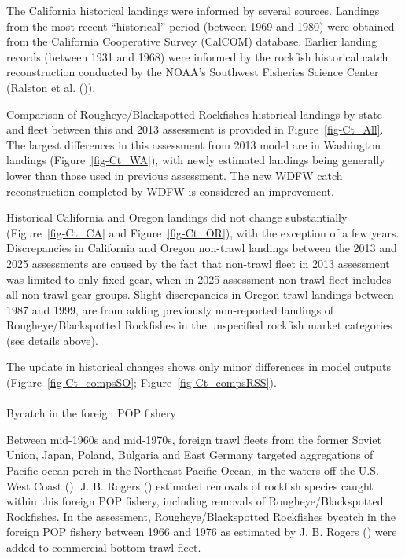\documentclass[
]{scrartcl}
\makeatletter
\let\oldparagraph\paragraph
\renewcommand{\paragraph}{
    \@ifstar
      \xxxParagraphStar
      \xxxParagraphNoStar
  }
\newcommand{\xxxParagraphStar}[1]{\oldparagraph*{#1}\mbox{}}
\newcommand{\xxxParagraphNoStar}[1]{\oldparagraph{#1}\mbox{}}
\makeatother
\begin{document}
The California historical landings were informed by several sources.
Landings from the most recent ``historical'' period (between 1969 and
1980) were obtained from the California Cooperative Survey (CalCOM)
database. Earlier landing records (between 1931 and 1968) were informed
by the rockfish historical catch reconstruction conducted by the NOAA's
Southwest Fisheries Science Center (Ralston et al.
()).

Comparison of Rougheye/Blackspotted Rockfishes historical landings by
state and fleet between this and 2013 assessment is provided in
Figure~\ref{fig-Ct_All}. The largest differences in this assessment from
2013 model are in Washington landings (Figure~\ref{fig-Ct_WA}), with
newly estimated landings being generally lower than those used in
previous assessment. The new WDFW catch reconstruction completed by WDFW
is considered an improvement.

Historical California and Oregon landings did not change substantially
(Figure~\ref{fig-Ct_CA} and Figure~\ref{fig-Ct_OR}), with the exception
of a few years. Discrepancies in California and Oregon non-trawl
landings between the 2013 and 2025 assessments are caused by the fact
that non-trawl fleet in 2013 assessment was limited to only fixed gear,
when in 2025 assessment non-trawl fleet includes all non-trawl gear
groups. Slight discrepancies in Oregon trawl landings between 1987 and
1999, are from adding previously non-reported landings of
Rougheye/Blackspotted Rockfishes in the unspecified rockfish market
categories (see details above).

The update in historical changes shows only minor differences in model
outputs (Figure~\ref{fig-Ct_compsSO}; Figure~\ref{fig-Ct_compsRSS}).

\paragraph{Bycatch in the foreign POP
fishery}\label{bycatch-in-the-foreign-pop-fishery}

Between mid-1960s and mid-1970s, foreign trawl fleets from the former
Soviet Union, Japan, Poland, Bulgaria and East Germany targeted
aggregations of Pacific ocean perch in the Northeast Pacific Ocean, in
the waters off the U.S. West Coast
(). J. B. Rogers ()
estimated removals of rockfish species caught within this foreign POP
fishery, including removals of Rougheye/Blackspotted Rockfishes. In the
assessment, Rougheye/Blackspotted Rockfishes bycatch in the foreign POP
fishery between 1966 and 1976 as estimated by J. B. Rogers
() were added to commercial
bottom trawl fleet.
\end{document}
